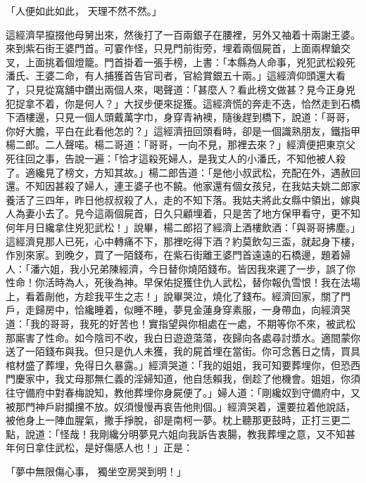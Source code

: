 「人便如此如此，  天理不然不然。」

這經濟早攛掇他母舅出來，然後打了一百兩銀子在腰裡，另外又袖着十兩謝王婆。來到紫石街王婆門首。可霎作怪，只見門前街旁，埋着兩個屍首，上面兩桿鎗交叉，上面挑着個燈籠。門首掛着一張手榜，上書：「本縣為人命事，兇犯武松殺死潘氏、王婆二命，有人捕獲首告官司者，官給賞銀五十兩。」這經濟仰頭還大看了，只見從窩舖中鑽出兩個人來，喝聲道：「甚麼人？看此榜文做甚？見今正身兇犯捉拿不着，你是何人？」大扠步便來捉獲。這經濟慌的奔走不迭，恰然走到石橋下酒樓邊，只見一個人頭戴萬字巾，身穿青衲襖，隨後趕到橋下，說道：「哥哥，你好大膽，平白在此看他怎的？」這經濟扭回頭看時，卻是一個識熟朋友，鐵指甲楊二郎。二人聲喏。楊二哥道：「哥哥，一向不見，那裡去來？」經濟便把東京父死往回之事，告說一遍：「恰才這殺死婦人，是我丈人的小潘氏，不知他被人殺了。適纔見了榜文，方知其故。」楊二郎告道：「是他小叔武松，充配在外，遇赦回還。不知因甚殺了婦人，連王婆子也不饒。他家還有個女孩兒，在我姑夫姚二郎家養活了三四年，昨日他叔叔殺了人，走的不知下落。我姑夫將此女縣中領出，嫁與人為妻小去了。見今這兩個屍首，日久只顧埋着，只是苦了地方保甲看守，更不知何年月日纔拿住兇犯武松！」說畢，楊二郎招了經濟上酒樓飲酒：「與哥哥拂塵。」這經濟見那人已死，心中轉痛不下，那裡吃得下酒？約莫飲勾三盃，就起身下樓，作別來家。到晚夕，買了一陌錢布，在紫石街離王婆門首遠遠的石橋邊，題着婦人：「潘六姐，我小兄弟陳經濟，今日替你燒陌錢布。皆因我來遲了一步，誤了你性命！你活時為人，死後為神。早保佑捉獲住仇人武松，替你報仇雪恨！我在法場上，看着剮他，方趁我平生之志！」說畢哭泣，燒化了錢布。經濟回家，關了門戶，走歸房中，恰纔睡着，似睡不睡，夢見金蓮身穿素服，一身帶血，向經濟哭道：「我的哥哥，我死的好苦也！實指望與你相處在一處，不期等你不來，被武松那廝害了性命。如今陰司不收，我白日遊遊蕩蕩，夜歸向各處尋討漿水。適間蒙你送了一陌錢布與我。但只是仇人未獲，我的屍首埋在當街。你可念舊日之情，買具棺材盛了葬埋，免得日久暴露。」經濟哭道：「我的姐姐，我可知要葬埋你，但恐西門慶家中，我丈母那無仁義的淫婦知道，他自恁賴我，倒趁了他機會。姐姐，你須往守備府中對春梅說知，教他葬埋你身屍便了。」婦人道：「剛纔奴到守備府中，又被那門神戶尉攔攩不放。奴須慢慢再哀告他則個。」經濟哭着，還要拉着他說話，被他身上一陣血腥氣，撒手掙脫，卻是南柯一夢。枕上聽那更鼓時，正打三更二點，說道：「怪哉！我剛纔分明夢見六姐向我訴告衷腸，教我葬埋之意，又不知甚年何日拿住武松，是好傷感人也！」正是：

「夢中無限傷心事，  獨坐空房哭到明！」

